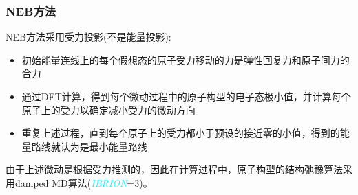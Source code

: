 \frame
{
	\frametitle{\textrm{NEB}方法}
\textrm{NEB}方法采用受力投影(不是能量投影):
\vskip 3pt
{\fontsize{7.2pt}{5.2pt}}
\begin{itemize}
	\item 初始能量连线上的每个假想态的原子受力移动的力是弹性回复力和原子间力的合力\\
		{\fontsize{7.2pt}{5.2pt}\selectfont{为了将初始能量路线直接推向最小能量路线，只考虑沿能量路线(该点切线)的弹性回复力投影和垂直能量路线(法线)的原子间作用力投影，而忽略其余力的贡献}}
	\item 通过\textrm{DFT}计算，得到每个微动过程中的原子构型的电子态极小值，并计算每个原子上的受力以确定减小受力的微动方向\\
		{\fontsize{7.2pt}{5.2pt}\selectfont{初始能量路线将会向最小能量路线移动}}
	\item 重复上述过程，直到每个原子上的受力都小于预设的接近零的小值，得到的能量路线就认为是最小能量路线
\end{itemize}
由于上述微动是根据受力推测的，因此在计算过程中，原子构型的结构弛豫算法采用\textrm{damped MD}算法(\textcolor{cyan}{\textit{IBRION}}=3)。
}

